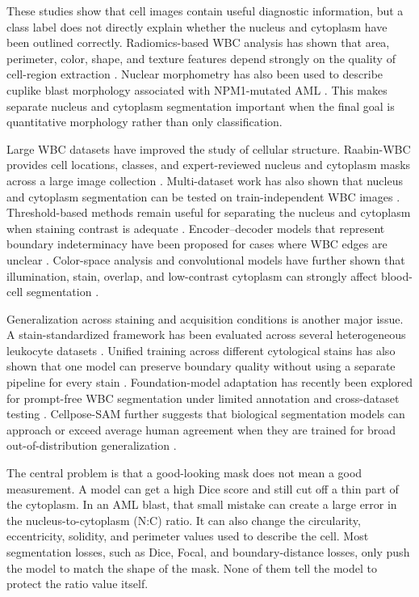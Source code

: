 \documentclass[pdflatex,sn-mathphys-num]{sn-jnl}%
\theoremstyle{thmstyleone}%
\theoremstyle{thmstyletwo}%
\theoremstyle{thmstylethree}%
\begin{document}
These studies show that cell images contain useful diagnostic information, but a class label does not directly explain whether the nucleus and cytoplasm have been outlined correctly. Radiomics-based WBC analysis has shown that area, perimeter, color, shape, and texture features depend strongly on the quality of cell-region extraction \cite{18}. Nuclear morphometry has also been used to describe cuplike blast morphology associated with NPM1-mutated AML \cite{19}. This makes separate nucleus and cytoplasm segmentation important when the final goal is quantitative morphology rather than only classification.

Large WBC datasets have improved the study of cellular structure. Raabin-WBC provides cell locations, classes, and expert-reviewed nucleus and cytoplasm masks across a large image collection \cite{20}. Multi-dataset work has also shown that nucleus and cytoplasm segmentation can be tested on train-independent WBC images \cite{21}. Threshold-based methods remain useful for separating the nucleus and cytoplasm when staining contrast is adequate \cite{22}. Encoder--decoder models that represent boundary indeterminacy have been proposed for cases where WBC edges are unclear \cite{23}. Color-space analysis and convolutional models have further shown that illumination, stain, overlap, and low-contrast cytoplasm can strongly affect blood-cell segmentation \cite{24}.

Generalization across staining and acquisition conditions is another major issue. A stain-standardized framework has been evaluated across several heterogeneous leukocyte datasets \cite{25}. Unified training across different cytological stains has also shown that one model can preserve boundary quality without using a separate pipeline for every stain \cite{26}. Foundation-model adaptation has recently been explored for prompt-free WBC segmentation under limited annotation and cross-dataset testing \cite{27}. Cellpose-SAM further suggests that biological segmentation models can approach or exceed average human agreement when they are trained for broad out-of-distribution generalization \cite{28}.

The central problem is that a good-looking mask does not mean a good measurement. A model can get a high Dice score and still cut off a thin part of the cytoplasm. In an AML blast, that small mistake can create a large error in the nucleus-to-cytoplasm (N:C) ratio. It can also change the circularity, eccentricity, solidity, and perimeter values used to describe the cell. Most segmentation losses, such as Dice, Focal, and boundary-distance losses, only push the model to match the shape of the mask. None of them tell the model to protect the ratio value itself.
\end{document}
